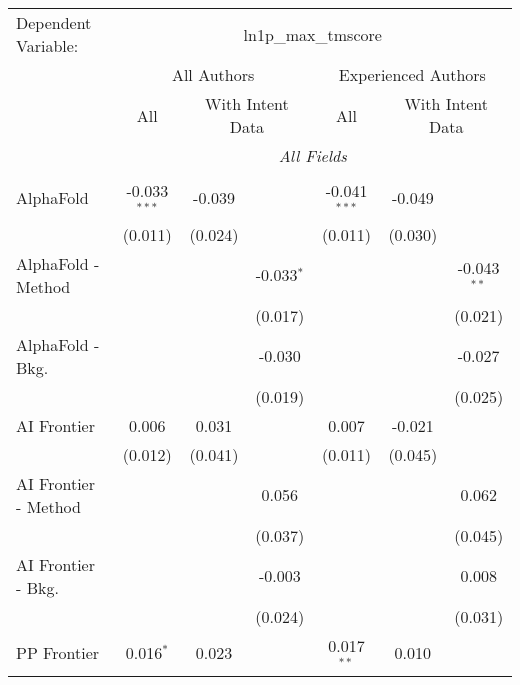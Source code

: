 \begingroup
\centering
\begin{tabular}{lcccccc}
   \tabularnewline \midrule \midrule
   Dependent Variable: & \multicolumn{6}{c}{ln1p\_max\_tmscore}\\
 & \multicolumn{3}{c}{All Authors} & \multicolumn{3}{c}{Experienced Authors} \\
\cmidrule(lr){2-4} \cmidrule(lr){5-7}
 & \multicolumn{1}{c}{All} & \multicolumn{2}{c}{With Intent Data} & \multicolumn{1}{c}{All} & \multicolumn{2}{c}{With Intent Data} \\
\cmidrule(lr){2-2} \cmidrule(lr){3-4} \cmidrule(lr){5-5} \cmidrule(lr){6-7}
 & \multicolumn{6}{c}{\textit{All Fields}} \\ \\
   AlphaFold            & -0.033$^{***}$ & -0.039  &              & -0.041$^{***}$ & -0.049        &   \\   
                        & (0.011)        & (0.024) &              & (0.011)        & (0.030)       &   \\   
   AlphaFold - Method   &                &         & -0.033$^{*}$ &                &               & -0.043$^{**}$\\   
                        &                &         & (0.017)      &                &               & (0.021)\\   
   AlphaFold - Bkg.     &                &         & -0.030       &                &               & -0.027\\   
                        &                &         & (0.019)      &                &               & (0.025)\\   
   AI Frontier          & 0.006          & 0.031   &              & 0.007          & -0.021        &   \\   
                        & (0.012)        & (0.041) &              & (0.011)        & (0.045)       &   \\   
   AI Frontier - Method &                &         & 0.056        &                &               & 0.062\\   
                        &                &         & (0.037)      &                &               & (0.045)\\   
   AI Frontier - Bkg.   &                &         & -0.003       &                &               & 0.008\\   
                        &                &         & (0.024)      &                &               & (0.031)\\   
   PP Frontier          & 0.016$^{*}$    & 0.023   &              & 0.017$^{**}$   & 0.010         &   \\   

\end{tabular}
